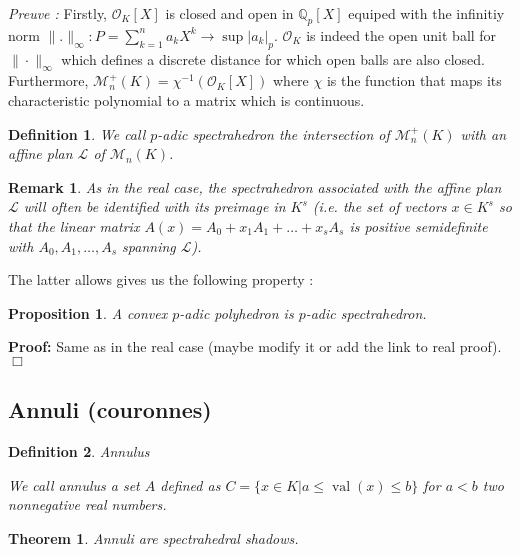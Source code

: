\documentclass[a4paper,12pt]{article}
\newenvironment{proof}{\hbox{}\vspace{-0.5cm} {\bf Proof:}}{\hfill $\Box$ \\}
\newtheorem{theorem}{Theorem}
\newtheorem{proposition}{Proposition}
\newtheorem{definition}{Definition}
\newtheorem{remark}{Remark}
\DeclareMathOperator{\val}{val}
\newcommand{\OK}{\mathcal{O}_K}
\begin{document}
\textit{Preuve :}  
Firstly, $\OK[X]$ is closed and open in $\mathbb{Q}_{ p }[X] $ equiped with the infinitiy norm $\|.\|_\infty : P = \sum_{k=1}^{n} a_k X^k \to \sup |a_k|_p$. $\OK$ is indeed the open unit ball for $\|\cdot \|_\infty$ which defines a discrete distance for which open balls are also closed.
Furthermore, $\mathcal{M}^+_{n}\left(K \right)  = \chi^{-1}( \OK[X]) $ where $\chi$ is the function that maps its characteristic polynomial to a matrix which is continuous.

%


\begin{definition}
	We call {\it $p$-adic spectrahedron} the intersection of $\mathcal{M}_n^+\left( K \right) $ with an affine plan $\mathcal{L}$ of $\mathcal{M}_n\left( K \right) $.
\end{definition}

\begin{remark}
	As in the real case, the spectrahedron associated with the affine plan $\mathcal{L}$ will often be identified with its preimage in $K^s$ (i.e. the set of vectors $x \in K ^s$ so that the linear matrix $A(x) = A_0 + x_1A_1 + \ldots + x_sA_s$ is positive semidefinite with $A_0,A_1,\ldots,A_s$ spanning $\mathcal{L}$). 
\end{remark}

The latter allows gives us the following property :
\begin{proposition}
	A convex $p$-adic polyhedron is $p$-adic spectrahedron.
\end{proposition}
\begin{proof}
	Same as in the real case (maybe modify it or add the link to real proof).
\end{proof}


\subsection{Annuli (couronnes)}
\begin{definition}
	Annulus
	
	We call {\it annulus} a set $A$ defined as $C = \{x \in K  | a\le \val\left(x\right) \le b\} $ for $a < b$ two nonnegative real numbers.
\end{definition}


\begin{theorem}
	Annuli are spectrahedral shadows.
\end{theorem} 
\end{document}
